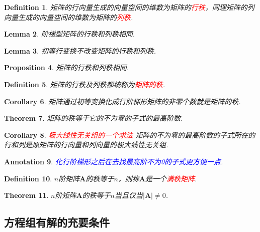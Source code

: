 \documentclass{article}
\newtheorem{theorem}{Theorem}[section]
\newtheorem{lemma}[theorem]{Lemma}
\newtheorem{corollary}[theorem]{Corollary}
\newtheorem{proposition}[theorem]{Proposition}
\newtheorem{definition}[theorem]{Definition}
\newtheorem{annotation}[theorem]{Annotation}
\newcommand{\mbf}[1]{\bm{#1}}
\newcommand{\redt}[1]{\textcolor{red}{#1}}
\newcommand{\bluet}[1]{\textcolor{blue}{#1}}
\begin{document}
\begin{definition}
\rm 矩阵的行向量生成的向量空间的维数为矩阵的\redt{行秩}，同理矩阵的列向量生成的向量空间的维数为矩阵的\redt{列秩}.
\end{definition}

\begin{lemma}
\rm 阶梯型矩阵的行秩和列秩相同.
\end{lemma}

\begin{lemma}
\rm 初等行变换不改变矩阵的行秩和列秩.
\end{lemma}

\begin{proposition}
\rm 矩阵的行秩和列秩相同.
\end{proposition}

\begin{definition}
\rm 矩阵的行秩及列秩都统称为\redt{矩阵的秩}.
\end{definition}

\begin{corollary}
\rm 矩阵通过初等变换化成行阶梯形矩阵的非零个数就是矩阵的秩.
\end{corollary}

\begin{theorem}
\rm 矩阵的秩等于它的不为零的子式的最高阶数.
\end{theorem}


\begin{corollary}
\rm \redt{极大线性无关组的一个求法} 矩阵的不为零的最高阶数的子式所在的行和列是原矩阵的行向量和列向量的极大线性无关组.
\end{corollary}

\begin{annotation}
\rm \bluet{化行阶梯形之后在去找最高阶不为0的子式更方便一点}.
\end{annotation}


\begin{definition}
\rm $n$阶矩阵$\mbf{A}$的秩等于$n$，则称$\mbf{A}$是一个\redt{满秩矩阵}.
\end{definition}

\begin{theorem}
\rm $n$阶矩阵$\mbf{A}$的秩等于$n$当且仅当$|\mbf{A}| \neq 0$.
\end{theorem}

\subsection{方程组有解的充要条件}
\end{document}
